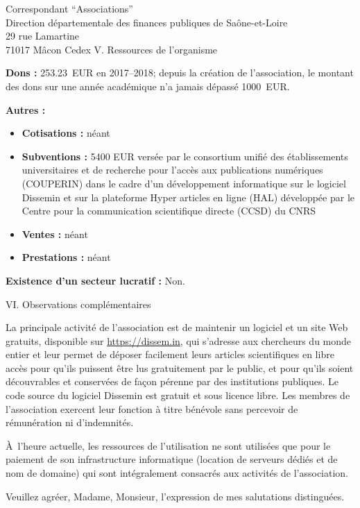 \documentclass[11pt]{lettre}
\begin{document}
\begin{letter}{Correspondant ``Associations''\\Direction départementale des finances publiques de Saône-et-Loire\\29 rue Lamartine\\71017 Mâcon Cedex}
  \bigskip
  {\Large V. Ressources de l'organisme}

  \textbf{Dons :} 253.23~EUR en 2017--2018; depuis la création de l'association,
  le montant des dons sur une année académique n'a jamais dépassé 1000~EUR.

  \textbf{Autres :}

  \begin{itemize}
    \item \textbf{Cotisations :} néant
    \item \textbf{Subventions :} 5400 EUR versée par le consortium unifié des
      établissements universitaires et de recherche pour l'accès aux
      publications numériques (COUPERIN) dans le cadre d'un développement
      informatique sur le logiciel Dissemin et sur la plateforme Hyper articles
          en ligne (HAL) développée par le Centre pour la communication
          scientifique directe (CCSD) du CNRS
    \item \textbf{Ventes :} néant
    \item \textbf{Prestations :} néant
  \end{itemize}

  \textbf{Existence d'un secteur lucratif :} Non.

  \bigskip
  {\Large VI. Observations complémentaires}

  La principale activité de l'association est de maintenir un logiciel et un
  site Web gratuits, disponible sur \url{https://dissem.in}, qui s'adresse aux chercheurs du monde
  entier et leur permet de déposer facilement leurs articles scientifiques en
  libre accès pour qu'ils puissent être lus gratuitement par le public, et pour
  qu'ils soient découvrables et conservées de façon pérenne par des institutions
  publiques. Le code source du logiciel Dissemin est gratuit et sous licence
  libre. Les membres de l'association exercent leur fonction à titre bénévole
  sans percevoir de rémunération ni d'indemnités.

  À l'heure actuelle, les ressources de l'utilisation ne sont utilisées que pour
  le paiement de son infrastructure informatique (location de serveurs dédiés et
  de nom de domaine) qui sont intégralement consacrés aux activités de
  l'association.

  Veuillez agréer, Madame, Monsieur, l'expression de mes salutations distinguées.

\vspace{2cm}

\hspace{10cm}\begin{minipage}{6cm}
\end{minipage}

\thispagestyle{empty}
\end{letter}
\end{document}
